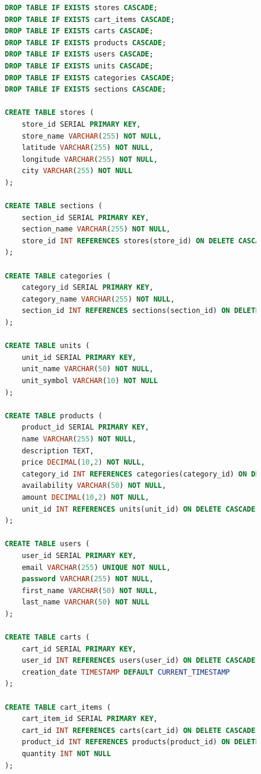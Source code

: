 \begin{figure}[H]
\begin{lstlisting}[language=SQL, caption=Przykładowa definicja inicjalizacji bazy danych, label=lst:init_tables]
DROP TABLE IF EXISTS stores CASCADE;
DROP TABLE IF EXISTS cart_items CASCADE;
DROP TABLE IF EXISTS carts CASCADE;
DROP TABLE IF EXISTS products CASCADE;
DROP TABLE IF EXISTS users CASCADE;
DROP TABLE IF EXISTS units CASCADE;
DROP TABLE IF EXISTS categories CASCADE;
DROP TABLE IF EXISTS sections CASCADE;

CREATE TABLE stores (
    store_id SERIAL PRIMARY KEY,
    store_name VARCHAR(255) NOT NULL,
    latitude VARCHAR(255) NOT NULL,
    longitude VARCHAR(255) NOT NULL,
    city VARCHAR(255) NOT NULL
);

CREATE TABLE sections (
    section_id SERIAL PRIMARY KEY,
    section_name VARCHAR(255) NOT NULL,
    store_id INT REFERENCES stores(store_id) ON DELETE CASCADE
);

CREATE TABLE categories (
    category_id SERIAL PRIMARY KEY,
    category_name VARCHAR(255) NOT NULL,
    section_id INT REFERENCES sections(section_id) ON DELETE CASCADE
);

CREATE TABLE units (
    unit_id SERIAL PRIMARY KEY,
    unit_name VARCHAR(50) NOT NULL,
    unit_symbol VARCHAR(10) NOT NULL
);

CREATE TABLE products (
    product_id SERIAL PRIMARY KEY,
    name VARCHAR(255) NOT NULL,
    description TEXT,
    price DECIMAL(10,2) NOT NULL,
    category_id INT REFERENCES categories(category_id) ON DELETE CASCADE,
    availability VARCHAR(50) NOT NULL,
    amount DECIMAL(10,2) NOT NULL,
    unit_id INT REFERENCES units(unit_id) ON DELETE CASCADE
);

CREATE TABLE users (
    user_id SERIAL PRIMARY KEY,
    email VARCHAR(255) UNIQUE NOT NULL,
    password VARCHAR(255) NOT NULL,
    first_name VARCHAR(50) NOT NULL,
    last_name VARCHAR(50) NOT NULL
);

CREATE TABLE carts (
    cart_id SERIAL PRIMARY KEY,
    user_id INT REFERENCES users(user_id) ON DELETE CASCADE,
    creation_date TIMESTAMP DEFAULT CURRENT_TIMESTAMP
);

CREATE TABLE cart_items (
    cart_item_id SERIAL PRIMARY KEY,
    cart_id INT REFERENCES carts(cart_id) ON DELETE CASCADE,
    product_id INT REFERENCES products(product_id) ON DELETE CASCADE,
    quantity INT NOT NULL
);
\end{lstlisting}
\end{figure}

